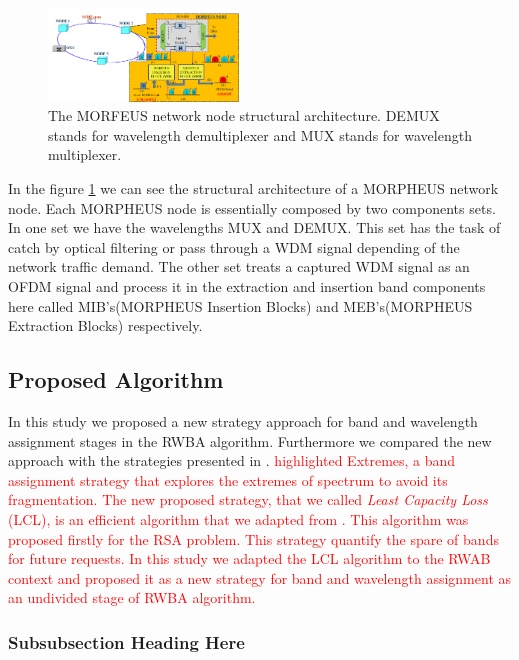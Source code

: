 \documentclass[journal,comsoc]{IEEEtran}
\begin{document}
\begin{figure}[h]
\centering
\includegraphics[width=0.45\textwidth]{NodeArchitecture2.png}
\caption{The MORFEUS network node structural architecture. DEMUX stands for wavelength demultiplexer and MUX stands for wavelength multiplexer.}
\label{morpheus_arch_node}
\end{figure}

In the figure \ref{morpheus_arch_node} we can see the structural architecture of a MORPHEUS network node. Each MORPHEUS node is essentially composed by two components sets. In one set we have the wavelengths MUX and DEMUX. This set has the task of catch by optical filtering or pass through a WDM signal depending of the network traffic demand. The other set treats a captured WDM signal as an OFDM signal and process it in the extraction and insertion band components here called MIB's(MORPHEUS Insertion Blocks) and MEB's(MORPHEUS Extraction Blocks) respectively.

\subsection{Proposed Algorithm}

In this study we proposed a new strategy approach for band and wavelength assignment stages in the RWBA algorithm. Furthermore we compared the new approach with the strategies presented in \cite{imoc_2015}.\textcolor{red}{ highlighted Extremes, a band assignment strategy that explores the extremes of spectrum to avoid its fragmentation. The new proposed strategy, that we called \textit{Least Capacity Loss} (LCL), is an efficient algorithm that we adapted from \cite{raul_lcl}. This algorithm was proposed firstly for the RSA problem. This strategy quantify the spare of bands for future requests. In this study we adapted the LCL algorithm to the RWAB context and proposed it as a new strategy for band and wavelength assignment as an undivided stage of RWBA algorithm.}


\subsubsection{Subsubsection Heading Here}
\end{document}
